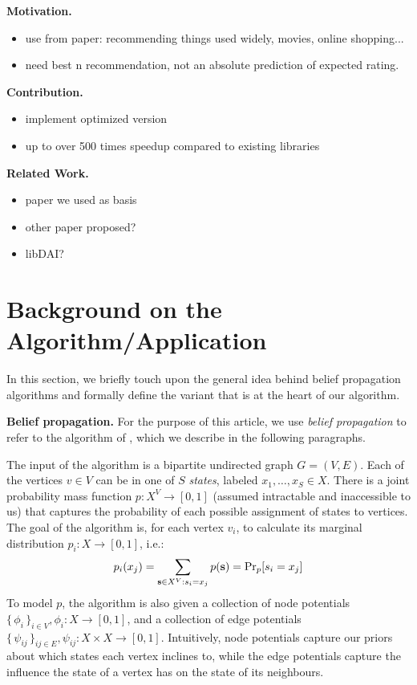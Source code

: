 \documentclass[letterpaper]{article}
\newcommand{\mypar}[1]{{\bf #1.}}
\begin{document}
\mypar{Motivation}
\begin{itemize}
\item use from paper: recommending things used widely, movies, online shopping...
\item need best n recommendation, not an absolute prediction of expected rating.
\end{itemize}

\mypar{Contribution}
\begin{itemize}
\item implement optimized version
\item up to over 500 times speedup compared to existing libraries
\end{itemize}

\mypar{Related Work}
\begin{itemize}
\item paper we used as basis
\item other paper proposed?
\item libDAI?
\end{itemize}


\section{Background on the Algorithm/Application}\label{sec:background}

In this section, we briefly touch upon the general idea behind belief
propagation algorithms and formally define the variant that is at the heart of
our algorithm.


\mypar{Belief propagation} For the purpose of this article, we use \emph{belief
propagation} to refer to the algorithm of \citet[Section
2.1]{top-n-recommendation}, which we describe in the following paragraphs.

The input of the algorithm is a bipartite undirected graph $G = (V, E)$. Each of the vertices $v\in V$ can
be in one of $S$ \emph{states}, labeled $x_1, \ldots, x_S \in X$. There is a
joint probability mass function $p: X^V \to [0, 1]$ (assumed intractable and
inaccessible to us) that captures the probability of each possible assignment of
states to vertices. The goal of the algorithm is, for each vertex $v_i$, to
calculate its marginal distribution $p_i: X \to [0, 1]$, i.e.:
%
$$p_i(x_j) = \sum_{\ves \in X^V: s_i = x_j} p(\ves) = \Pr_p[s_i = x_j]$$
%
To model $p$, the algorithm is also given a collection of node potentials
$\{\,\phi_i\,\}_{i \in V}, \phi_i: X \to [0, 1]$, and a collection of edge
potentials $\{\,\psi_{ij}\,\}_{ij \in E}, \psi_{ij}: X\times X \to [0, 1]$.
Intuitively, node potentials capture our priors about which states each vertex
inclines to, while the edge potentials capture the influence the state of a
vertex has on the state of its neighbours.
\end{document}
